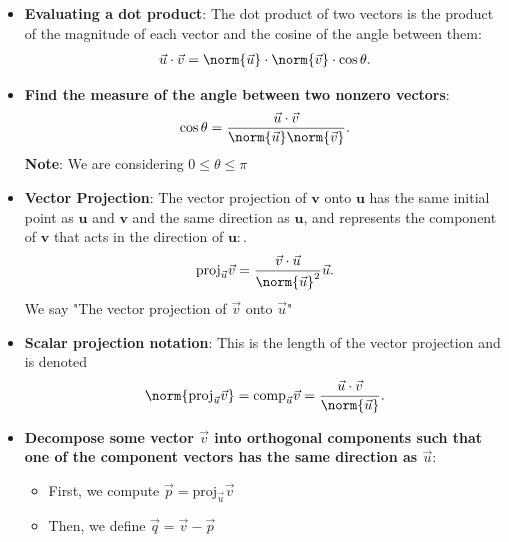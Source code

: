\documentclass{report}
\begin{document}
\begin{itemize}
\begin{enumerate}
                \end{enumerate}
            \item \textbf{Evaluating a dot product}: 
                The dot product of two vectors is the product of the magnitude of each vector and the cosine of the angle between them:
                \begin{align*}
                    \vec{u} \cdot \vec{v} = \norm{\vec{u}} \cdot \norm{\vec{v}} \cdot \cos{\theta }
                .\end{align*}
            \item \textbf{Find the measure of the angle between two nonzero vectors}:
                \begin{align*}
                    \cos{\theta } = \frac{\vec{u} \cdot \vec{v}}{\norm{\vec{u}}\norm{\vec{v}}}
                .\end{align*}
                \bigbreak \noindent 
                \textbf{Note}: We are considering $0 \leq \theta  \leq \pi $
            \item \textbf{Vector Projection}: The vector projection of $\mathbf{v}$ onto $\mathbf{u}$ has the same initial point as $\mathbf{u}$ and $\mathbf{v}$ and the same direction as $\mathbf{u}$, and represents the component of $\mathbf{v}$ that acts in the direction of $\mathbf{u}:$.
                \begin{align*}
                    \text{proj}_{\vec{u}}\vec{v} = \frac{\vec{v} \cdot \vec{u}}{\norm{\vec{u}}^{2}}\vec{u}
                .\end{align*}
                We say "The vector projection of $\vec{v}$ onto $\vec{u}$"
            \item \textbf{Scalar projection notation}: This is the length of the vector projection and is denoted
                \begin{align*}
                    \norm{\text{proj}_{\vec{u}}\vec{v}} = \text{comp}_{\vec{u}}\vec{v} = \frac{\vec{u} \cdot \vec{v}}{\norm{\vec{u}}}
                .\end{align*}
                \pagebreak 
            \item \textbf{Decompose some vector $\vec{v}$ into orthogonal components such that one of the component vectors has the same direction as  $\vec{u}$}:
                \begin{itemize}
                    \item First, we compute $\vec{p} = \text{proj}_{\vec{u}}\vec{v} $
                    \item Then, we define $\vec{q}  = \vec{v} - \vec{p}$ 

\end{itemize}
\end{itemize}
\end{document}
